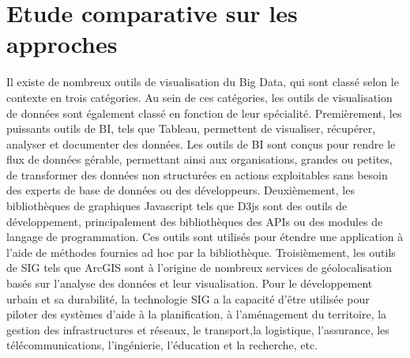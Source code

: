 \documentclass[french, a4paper, 12pt]{report}
\begin{document}
\section{Etude comparative sur les approches }
\label{sec:comparative}
Il existe de nombreux outils de visualisation du Big Data, qui sont classé selon le contexte en trois catégories. Au sein de ces catégories, les outils de visualisation de données sont également classé en fonction de leur spécialité. 
Premièrement, les puissants outils de BI, tels que Tableau, permettent de visualiser, récupérer, analyser et documenter des données. Les outils de BI sont conçus pour rendre le flux de données gérable, permettant ainsi aux organisations, grandes ou petites, de transformer des données non structurées en actions exploitables sans besoin des experts de base de données ou des développeurs.
Deuxièmement, les bibliothèques de graphiques Javascript tels que D3js sont des outils de développement, principalement des bibliothèques des APIs ou des modules de langage de programmation. Ces outils sont utilisés pour étendre une application à l’aide de méthodes fournies ad hoc par la bibliothèque. 
Troisièmement, les outils de SIG tels que ArcGIS sont à l’origine de nombreux services de géolocalisation basés sur l’analyse des données et leur visualisation. Pour le développement urbain et sa durabilité, la technologie SIG a la capacité d’être utilisée pour piloter des systèmes d’aide à la planification, à l’aménagement du territoire, la gestion des infrastructures et réseaux, le transport,la logistique, l’assurance, les télécommunications, l’ingénierie, l’éducation et la recherche, etc. 
\end{document}
